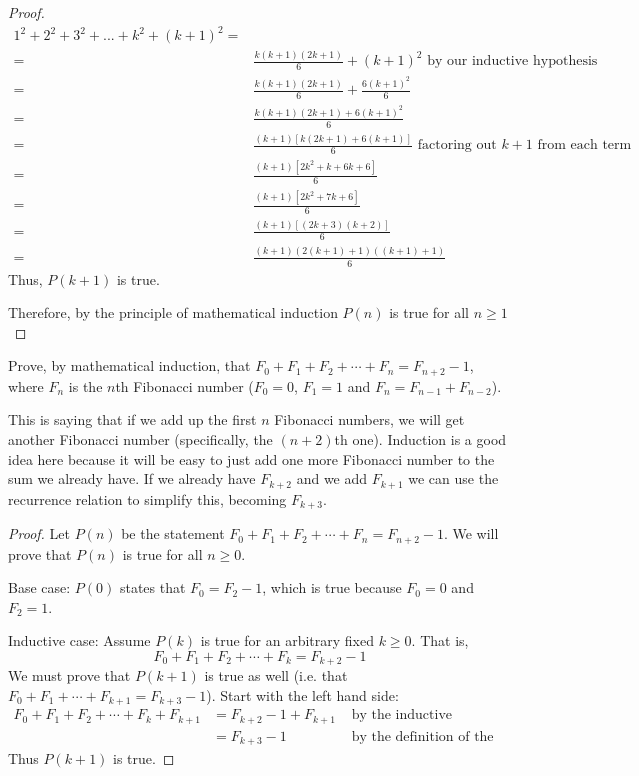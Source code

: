 \begin{questions}
\begin{solution}
\begin{proof}
\begin{align*}
1^2 +2^2 +3^2+...+k^2+{(k+1)}^2 = \\
= & \frac{k(k+1)(2k+1)}{6} +(k+1)^2 \mbox{ by our inductive hypothesis}\\
= & \frac{k(k+1)(2k+1)}{6} +\frac{6(k+1)^2}{6} \\
= & \frac{k(k+1)(2k+1)+6(k+1)^2}{6} \\
= & \frac{(k+1)[k(2k+1)+6(k+1)]}{6} \mbox{ factoring out $k+1$ from each term}\\
= & \frac{(k+1)[2k^2+k+6k+6]}{6}\\
= & \frac{(k+1)[2k^2+7k+6]}{6}\\
= & \frac{(k+1)[(2k+3)(k+2)]}{6}\\
= & \frac{(k+1)(2(k+1)+1)((k+1)+1)}{6}
\end{align*}
Thus, $P(k+1)$ is true.

Therefore, by the principle of mathematical induction $P(n)$ is true for all $n \geq 1$ 
\end{proof}
\end{solution}
\question  Prove, by mathematical induction, that $F_0 + F_1 + F_2 + \cdots + F_{n} = F_{n+2} - 1$, where $F_n$ is the $n$th Fibonacci number ($F_0 = 0$, $F_1 = 1$ and $F_n = F_{n-1} + F_{n-2}$).
\begin{solution}
This is saying that if we add up the first $n$ Fibonacci numbers, we will get another Fibonacci number (specifically, the $(n+2)$th one).  Induction is a good idea here because it will be easy to just add one more Fibonacci number to the sum we already have.  If we already have $F_{k+2}$ and we add $F_{k+1}$ we can use the recurrence relation to simplify this, becoming $F_{k+3}$.  
 
  \begin{proof}
    Let $P(n)$ be the statement $F_0 + F_1 + F_2 + \cdots + F_n = F_{n+2} - 1$.  We will prove that $P(n)$ is true for all $n \ge 0$.  
    
    Base case: $P(0)$ states that $F_0 = F_2 - 1$, which is true because $F_0 = 0$ and $F_2 = 1$.
    
    Inductive case:  Assume $P(k)$ is true for an arbitrary fixed $k \ge 0$.  That is, \[F_0 + F_1 + F_2 + \cdots + F_k = F_{k+2} - 1\]
    We must prove that $P(k+1)$ is true as well (i.e. that $F_0 + F_1 + \cdots +F_{k+1} = F_{k+3} - 1$).  Start with the left hand side:
    \begin{align*}
      F_0 + F_1 + F_2 + \cdots + F_k + F_{k+1} & = F_{k+2} - 1 + F_{k+1} & \mbox{ by the inductive hypothesis}\\
      & = F_{k+3} - 1 & \mbox{ by the definition of the Fibonacci numbers}
    \end{align*}
    Thus $P(k+1)$ is true.
    

\end{proof}
\end{solution}
\end{questions}
